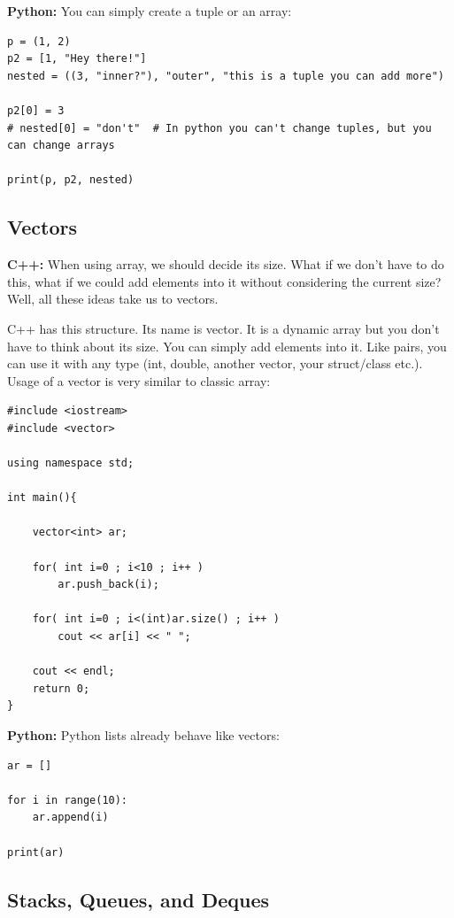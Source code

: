 \documentclass[12pt]{article}
\begin{document}
\textbf{Python:} You can simply create a tuple or an array:

\begin{verbatim}
p = (1, 2)
p2 = [1, "Hey there!"]
nested = ((3, "inner?"), "outer", "this is a tuple you can add more")

p2[0] = 3
# nested[0] = "don't"  # In python you can't change tuples, but you can change arrays

print(p, p2, nested)
\end{verbatim}


\subsection{Vectors}

\textbf{C++:} When using array, we should decide its size. What if we don't have to do this, what if we could add elements into it without considering the current size? Well, all these ideas take us to vectors.

C++ has this structure. Its name is vector. It is a dynamic array but you don't have to think about its size. You can simply add elements into it. Like pairs, you can use it with any type (int, double, another vector, your struct/class etc.). Usage of a vector is very similar to classic array:

\begin{verbatim}
#include <iostream>
#include <vector>

using namespace std;

int main(){

    vector<int> ar;

    for( int i=0 ; i<10 ; i++ )
        ar.push_back(i);
    
    for( int i=0 ; i<(int)ar.size() ; i++ )
        cout << ar[i] << " ";
    
    cout << endl;
    return 0;
}
\end{verbatim}

\cleardoublepage
\textbf{Python:} Python lists already behave like vectors:

\begin{verbatim}
ar = []

for i in range(10):
    ar.append(i)

print(ar)
\end{verbatim}

\subsection{Stacks, Queues, and Deques}
\end{document}
